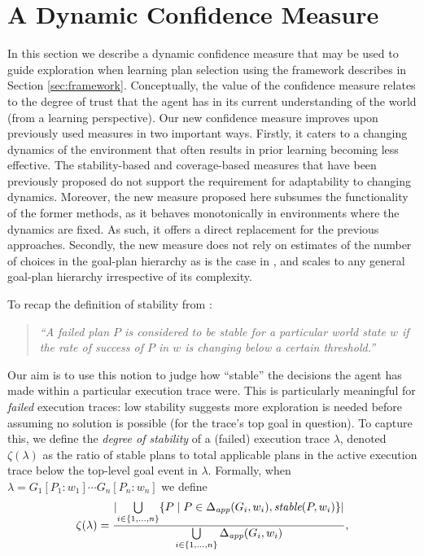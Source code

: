 


\section{A Dynamic Confidence Measure}\label{sec:confidence}

In this section we describe a dynamic confidence measure that may be used to guide exploration when learning plan selection using the framework describes in Section \ref{sec:framework}. Conceptually, the value of the confidence measure relates to the degree of trust that the agent has in its current understanding of the world (from a learning perspective). Our new confidence measure improves upon previously used measures in two important ways. 
%
Firstly, it caters to a changing dynamics of the environment that often results in prior learning becoming less effective. The stability-based \cite{airiau09:enhancing} and coverage-based \cite{singh10:extending,singh10:learning} measures that have been previously proposed do not support the requirement for adaptability to changing dynamics. Moreover, the new measure proposed here subsumes the functionality of the former methods, as it behaves monotonically in environments where the dynamics are fixed. As such, it offers a direct replacement for the previous approaches. 
%
Secondly, the new measure does not rely on estimates of the number of choices in the goal-plan hierarchy as is the case in \cite{singh10:extending,singh10:learning}, and scales to any general goal-plan hierarchy irrespective of its complexity.


To recap the definition of stability from \cite{singh10:learning}:

\begin{quote}
\emph{``A failed plan $P$ is considered to be stable for a particular world state $w$ if the rate of success of $P$ in $w$ is changing below a certain threshold.''}
\end{quote} 

\newcommand{\ds}{\zeta}
\newcommand{\app}{\mathname{app}}
\newcommand{\stable}{\mathname{stable}}

Our aim is to use this notion to judge how ``stable'' the decisions the agent has made within a particular execution trace were. This is particularly meaningful for \emph{failed} execution traces: low stability suggests more exploration is needed before assuming no solution is possible (for the trace's top goal in question).
To capture this, we define the \emph{degree of stability} of a (failed) execution trace $\lambda$, denoted $\ds(\lambda)$ as the ratio of stable plans to total applicable plans in the active execution trace below the top-level goal event in $\lambda$. Formally, when $\lambda= G_1[P_1:w_1] \cdots G_n[P_n:w_n]$ we define 
\[
\ds(\lambda) = 
	\frac{ 
			\card{ \bigcup\limits_{i \in \{1,\ldots,n\}} 
						\set{P \mid P \in \Delta_{\app}(G_i,w_i), \stable(P,w_i)} } 
		}
		{
			\bigcup\limits_{i \in \{1,\ldots,n\}} \Delta_{\app}(G_i,w_i) 
		},
\]

